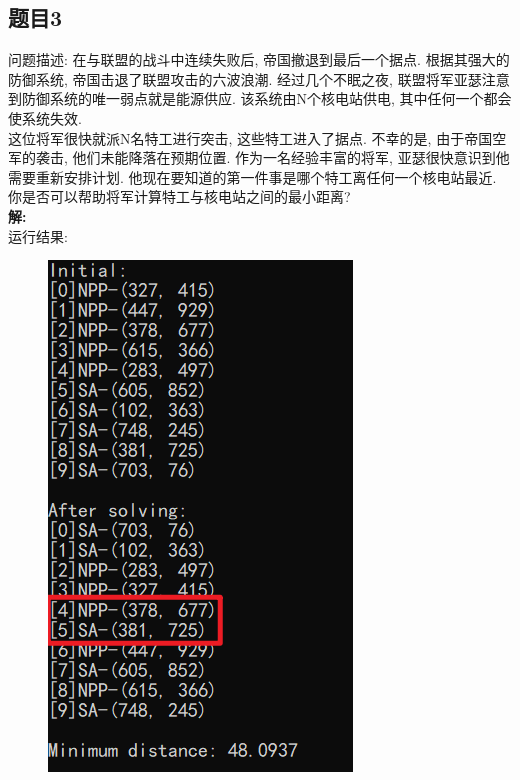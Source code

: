 \documentclass[a4paper]{ctexart}
\begin{document}
\begin{sloppypar}
    \subsection*{题目3}
    问题描述: 在与联盟的战斗中连续失败后, 帝国撤退到最后一个据点.
    根据其强大的防御系统, 帝国击退了联盟攻击的六波浪潮.
    经过几个不眠之夜, 联盟将军亚瑟注意到防御系统的唯一弱点就是能源供应.
    该系统由N个核电站供电, 其中任何一个都会使系统失效. \\
    这位将军很快就派N名特工进行突击, 这些特工进入了据点.
    不幸的是, 由于帝国空军的袭击, 他们未能降落在预期位置.
    作为一名经验丰富的将军, 亚瑟很快意识到他需要重新安排计划.
    他现在要知道的第一件事是哪个特工离任何一个核电站最近.
    你是否可以帮助将军计算特工与核电站之间的最小距离? \\
    \textbf{解:} \\
    
    运行结果: \\
    \begin{figure}[h]
        \centering
        \includegraphics[scale=0.8]{images/run1.png}\;\;\;\;\;

\end{figure}
\end{sloppypar}
\end{document}
